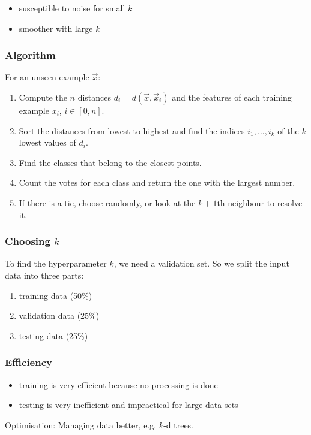 \documentclass{article}
\begin{document}
\begin{itemize}
	\item susceptible to noise for small $k$
	\item smoother with large $k$
\end{itemize}

\subsubsection{Algorithm}

For an unseen example $\vec x$:
\begin{enumerate}
	\item Compute the $n$ distances $d_i=d(\vec x, \vec x_i)$ and the features
		  of each training example $x_i$, $i\in[0,n]$.
    \item Sort the distances from lowest to highest and find the indices $i_1,...,i_k$ of the $k$ lowest values of $d_i$.
    \item Find the classes that belong to the closest points.
    \item Count the votes for each class and return the one with the largest number.
    \item If there is a tie, choose randomly, or look at the $k+1$th neighbour to resolve it.
\end{enumerate}

\subsubsection{Choosing $k$}

To find the hyperparameter $k$, we need a validation set. So we split
the input data into three parts:
\begin{enumerate}
	\item training data (50\%)
	\item validation data (25\%)
	\item testing data (25\%)
\end{enumerate}

\subsubsection{Efficiency}
\begin{itemize}
	\item training is very efficient because no processing is done
	\item testing is very inefficient and impractical for large data sets
\end{itemize}

Optimisation: Managing data better, e.g. $k$-d trees.
\end{document}
